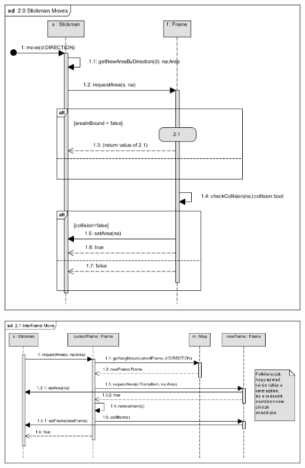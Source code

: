 		\begin{center}
			\includegraphics[scale=0.8]{resources/seq_2-0_stickmanMoves.png}
		\end{center}
	
		\begin{center}
			\includegraphics[scale=0.8]{resources/seq_2-1_interframeMove.png}
		\end{center}
	
